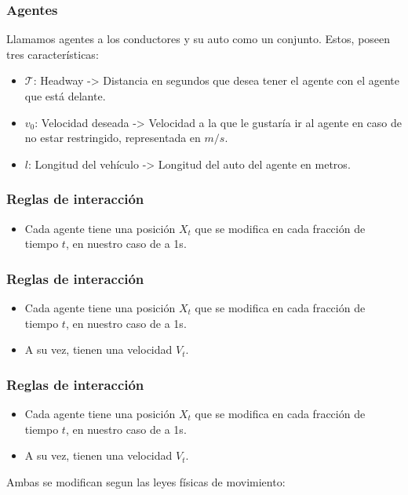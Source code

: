 \documentclass[10pt, compress]{beamer}
\begin{document}
\begin{frame}[fragile]

\frametitle{Agentes}

Llamamos agentes a los conductores y su auto como un conjunto. Estos, poseen tres caracter\'isticas:

\begin{itemize}
\item $\mathcal{T}$: Headway -> Distancia en segundos que desea tener el agente con el agente que est\'a delante.
\item $v_0$: Velocidad deseada -> Velocidad a la que le gustar\'ia ir al agente en caso de no estar restringido, representada en $m/s$.
\item $l$: Longitud del veh\'iculo -> Longitud del auto del agente en metros.
\end{itemize}
\addtocounter{framenumber}{-1}
\end{frame}

\begin{frame}[fragile]

\frametitle{Reglas de interacci\'on}
\begin{itemize}
\item Cada agente tiene una posici\'on $X_t$ que se modifica en cada fracci\'on de tiempo $t$, en nuestro caso de a 1s.
\end{itemize}


\end{frame}

\begin{frame}[fragile]

\frametitle{Reglas de interacci\'on}
\begin{itemize}
\item Cada agente tiene una posici\'on $X_t$ que se modifica en cada fracci\'on de tiempo $t$, en nuestro caso de a 1s.
\item A su vez, tienen una velocidad $V_t$.
\end{itemize}
\addtocounter{framenumber}{-1}
\end{frame}

\begin{frame}[fragile]

\frametitle{Reglas de interacci\'on}
\begin{itemize}
\item Cada agente tiene una posici\'on $X_t$ que se modifica en cada fracci\'on de tiempo $t$, en nuestro caso de a 1s.
\item A su vez, tienen una velocidad $V_t$.
\end{itemize}
Ambas se modifican segun las leyes f\'isicas de movimiento:
\addtocounter{framenumber}{-1}
\end{frame}
\end{document}
